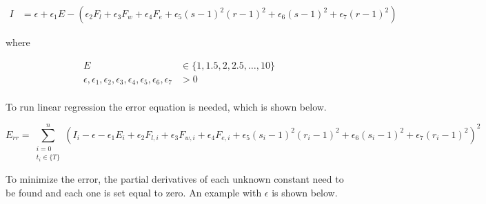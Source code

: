 \begin{minipage}{\textwidth}
	\begin{equation}
		\label{eq:BasicSurfaceEquation}
		\begin{split}
			I & =\epsilon+\epsilon_1 E-\left( 
				\epsilon_2 F_l+\epsilon_3 F_w+\epsilon_4 F_e+\epsilon_5 (s-1)^2(r-1)^2+\epsilon_6 (s-1)^2+\epsilon_7 (r-1)^2
			\right)
		\end{split}
	\end{equation}
	\centerline{where}
	\begin{equation*}
	    \begin{split}
	        E & \in \{ 1,1.5,2,2.5, \dots ,10 \} \\
	        \epsilon, \epsilon_1, \epsilon_2, \epsilon_3, \epsilon_4, \epsilon_5,\epsilon_6,\epsilon_7 & > 0 \\
	    \end{split}
	\end{equation*}
\end{minipage}

To run linear regression the error equation is needed, which is shown below.

\begin{equation*}
    E_{rr}=\sum_{
            \substack{i=0\\ t_i\in \{ T \}}
        }^n \left(
        I_i
        -\epsilon
        -\epsilon_1 E_i
        +\epsilon_2 F_{l,i}
        +\epsilon_3 F_{w,i}
        +\epsilon_4 F_{e,i}
        +\epsilon_5 (s_i-1)^2(r_i-1)^2
        +\epsilon_6 (s_i-1)^2
        +\epsilon_7 (r_i-1)^2
    \right)^2
\end{equation*}

To minimize the error, the partial derivatives of each unknown constant need to be found and each one is set equal to zero. An example with $\epsilon$ is shown below.

